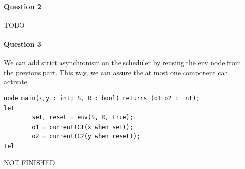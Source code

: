 \documentclass{article}
\begin{document}
\paragraph{Question 2}

TODO

\paragraph{Question 3}

We can add strict asynchronism on the scheduler by reusing the env node from the
previous part. This way, we can assure the at most one component can activate.

\begin{verbatim}
node main(x,y : int; S, R : bool) returns (o1,o2 : int);
let
        set, reset = env(S, R, true);
        o1 = current(C1(x when set));
        o2 = current(C2(y when reset));
tel
\end{verbatim}

NOT FINISHED

\end{document}
